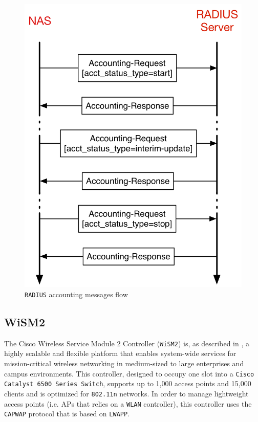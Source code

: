 	\begin{figure}[H]
		\begin{center}
			\includegraphics[width=.5\linewidth]{Pictures/chapter2/radius-accounting.png}
			\caption{\texttt{RADIUS} accounting messages flow}
		\end{center}
	\end{figure}


\subsection{WiSM2}
The Cisco Wireless Service Module 2 Controller (\texttt{WiSM2}) is, as described in \cite{wism2}, a highly scalable and flexible platform that enables system-wide services for mission-critical wireless networking in medium-sized to large enterprises and campus environments. This controller, designed to occupy one slot into a \texttt{Cisco Catalyst 6500 Series Switch}, supports up to 1,000 access points and 15,000 clients and is optimized for \texttt{802.11n} networks. In order to manage lightweight access points (i.e. APs that relies on a \texttt{WLAN} controller), this controller uses the \texttt{CAPWAP} protocol that is based on \texttt{LWAPP}.

